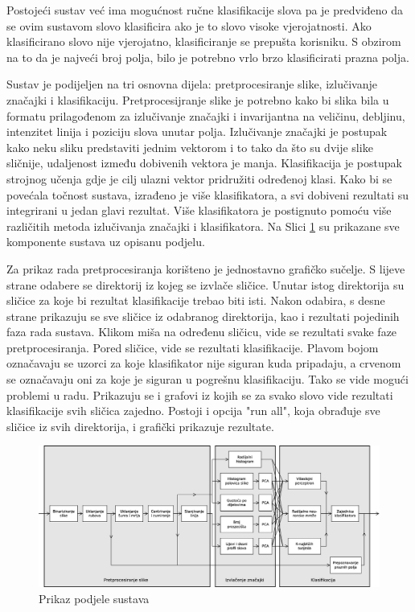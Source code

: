 \documentclass[a4paper,twocolumn,dvipdfm]{article}
\begin{document}
Postojeći sustav već ima mogućnost ručne klasifikacije slova pa je predviđeno
da se ovim sustavom slovo klasificira ako je to slovo visoke vjerojatnosti. Ako
klasificirano slovo nije vjerojatno, klasificiranje se prepušta korisniku. S
obzirom na to da je najveći broj polja, bilo je potrebno vrlo brzo klasificirati
prazna polja.

Sustav je podijeljen na tri osnovna dijela: pretprocesiranje slike, izlučivanje
značajki i klasifikaciju. Pretprocesijranje slike je potrebno kako bi slika bila
u formatu prilagođenom za izlučivanje značajki i invarijantna na veličinu,
debljinu, intenzitet linija i poziciju slova unutar polja. Izlučivanje značajki
je postupak kako neku sliku predstaviti jednim vektorom i to tako da što su
dvije slike sličnije, udaljenost između dobivenih vektora je manja.
Klasifikacija je postupak strojnog učenja gdje je cilj ulazni vektor pridružiti
određenoj klasi. Kako bi se povećala točnost sustava, izrađeno je više
klasifikatora, a svi dobiveni rezultati su integrirani u jedan glavi rezultat.
Više klasifikatora je postignuto pomoću više različitih metoda izlučivanja
značajki i klasifikatora. Na Slici \ref{figure:cijeliSustav} su prikazane sve
komponente sustava uz opisanu podjelu.

Za prikaz rada pretprocesiranja korišteno je jednostavno grafičko sučelje.
S lijeve strane odabere se direktorij iz kojeg se izvlače sličice. Unutar istog direktorija su sličice za koje bi rezultat klasifikacije trebao biti isti.
Nakon odabira, s desne strane prikazuju se sve sličice iz odabranog direktorija, kao i rezultati pojedinih faza rada sustava.
Klikom miša na određenu sličicu, vide se rezultati svake faze pretprocesiranja.
Pored sličice, vide se rezultati klasifikacije.
Plavom bojom označavaju se uzorci za koje klasifikator nije siguran kuda pripadaju, a crvenom se označavaju oni za koje je siguran u pogrešnu klasifikaciju.
Tako se vide mogući problemi u radu.
Prikazuju se i grafovi iz kojih se za svako slovo vide rezultati klasifikacije svih sličica zajedno.
Postoji i opcija "run all", koja obrađuje sve sličice iz svih direktorija, i grafički prikazuje rezultate.


\begin{figure}
\centering
\includegraphics[width=\textwidth]{Diagram1.eps}
\caption{Prikaz podjele sustava}
\label{figure:cijeliSustav}
\end{figure}
\end{document}
